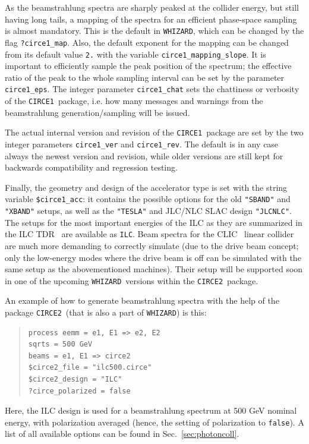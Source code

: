\documentclass[12pt]{book}
\newcommand{\ttt}[1]{\texttt{#1}}
\newcommand{\whizard}{\ttt{WHIZARD}}
\newcommand{\circeone}{\ttt{CIRCE1}}
\newcommand{\circetwo}{\ttt{CIRCE2}}
\begin{document}
As the beamstrahlung spectra are sharply peaked at the collider
energy, but still having long tails, a mapping of the spectra for an
efficient phase-space sampling is almost mandatory. This is the
default in \whizard, which can be changed by the flag
\ttt{?circe1\_map}. Also, the default exponent for the mapping can be
changed from its default value \ttt{2.} with the variable
\ttt{circe1\_mapping\_slope}. It is important to efficiently sample
the peak position of the spectrum; the effective ratio of the peak to
the whole sampling interval can be set by the parameter
\ttt{circe1\_eps}. The integer parameter \ttt{circe1\_chat} sets the
chattiness or verbosity of the \circeone\ package, i.e. how many
messages and warnings from the beamstrahlung generation/sampling will
be issued.

The actual internal version and revision of the \circeone\ package are
set by the two integer parameters \ttt{circe1\_ver} and
\ttt{circe1\_rev}. The default is in any case always the newest
version and revision, while older versions are still kept for
backwards compatibility and regression testing.

Finally, the geometry and design of the accelerator type is set with
the string variable \ttt{\$circe1\_acc}: it contains the possible
options for the old \ttt{"SBAND"} and \ttt{"XBAND"} setups, as well as
the \ttt{"TESLA"} and JLC/NLC SLAC design \ttt{"JLCNLC"}. The setups
for the most important energies of the ILC as they are summarized in
the ILC
TDR~\cite{Behnke:2013xla,Baer:2013cma,Adolphsen:2013jya,Adolphsen:2013kya}
are available as \ttt{ILC}. Beam spectra for the
CLIC~\cite{Aicheler:2012bya,Lebrun:2012hj,Linssen:2012hp} linear
collider are much more demanding to correctly simulate (due to the
drive beam concept; only the low-energy modes where the drive beam is
off can be simulated with the same setup as the abovementioned
machines). Their setup will be supported soon in one of the upcoming
\whizard\ versions within the \circetwo\ package.

An example of how to generate beamstrahlung spectra with the help of
the package \circetwo\ (that is also a part of \whizard) is this:
\begin{quote}
\begin{footnotesize}
\begin{Verbatim}
process eemm = e1, E1 => e2, E2
sqrts = 500 GeV
beams = e1, E1 => circe2
$circe2_file = "ilc500.circe"
$circe2_design = "ILC"
?circe_polarized = false
\end{Verbatim}
\end{footnotesize}%
\end{quote}
Here, the ILC design is used for a beamstrahlung spectrum at 500 GeV
nominal energy, with polarization averaged (hence, the setting of
polarization to \ttt{false}). A list of all available options can be
found in Sec.~\ref{sec:photoncoll}.
\end{document}
